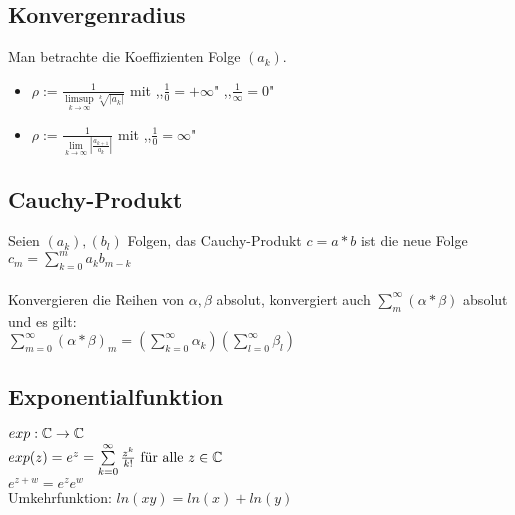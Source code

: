 \documentclass[german]{latex4ei/latex4ei_sheet}
\begin{document}
\begin{sectionbox}
	\subsection{Konvergenradius}
	Man betrachte die Koeffizienten Folge $(a_k)$.\\
	\begin{itemize}
	\item $\rho := \frac{1}{\limsup\limits_{k \to \infty}\sqrt[k]{|a_k|}}$ mit ,,$\frac{1}{0}=+\infty$"  ,,$\frac{1}{\infty}=0$" 
	\item  $\rho := \frac{1}{\lim\limits_{k \to \infty}|\frac{a_{k+1}}{a_k}|} $ mit ,,$\frac{1}{0}=\infty$" 	
	\end{itemize}

\end{sectionbox}

\begin{sectionbox}
	\subsection{Cauchy-Produkt}
	Seien $(a_k),(b_l)$ Folgen, das Cauchy-Produkt $c=a*b$ ist die neue Folge $c_m = \sum\limits_{k=0}^{m}a_k b_{m-k}$\\ \\
	Konvergieren die Reihen von $\alpha,\beta$ absolut, konvergiert auch  $\sum_{m}^{\infty}(\alpha * \beta)$ absolut und es gilt: \\
	$\sum\limits_{m=0}^{\infty}(\alpha * \beta)_m =(\sum\limits_{k=0}^{\infty}\alpha_k)(\sum\limits_{l=0}^{\infty}\beta_l)$

\end{sectionbox}

\begin{sectionbox}
	\subsection{Exponentialfunktion}
	$exp:\mathbb C\rightarrow\mathbb C$\\
	$exp(z)=e^z=\sum\limits_{k=0}^{\infty}\frac{z^k}{k!} \text{ für alle } z \in \mathbb C$\\
	$e^{z+w}=e^ze^w$\\
	Umkehrfunktion: $ln(xy)=ln(x)+ln(y)$
	
\end{sectionbox}
\end{document}
